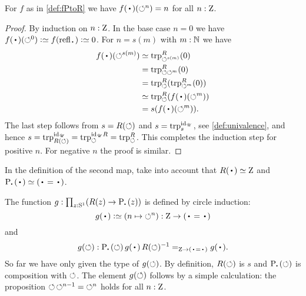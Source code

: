 \begin{lemma}\label{lem:windingnumber}
For $f$ as in \cref{def:fPtoR} we have $f(\base)(\Sloop^n)=n$ for all $n:\mathrm{Z}$.
\end{lemma}
\begin{proof}
By induction on $n:\mathrm{Z}$.  In the base case $n=0$ we have
$f(\base)(\Sloop^0)\defeq f(\refl\base)\defeq 0$.
For $n=s(m)$ with $m:\mathbb{N}$ we have
\begin{align*}
  f(\base)(\Sloop^{s(m)})&\jdeq\trp[R]{\Sloop^{s(m)}}(0)\\
  &=\trp[R]{\Sloop \Sloop^{m}}(0)\\
  &=\trp[R]{\Sloop}(\trp[R]{\Sloop^m}(0))\\
  &\jdeq \trp[R]{\Sloop}(f(\base)(\Sloop^{m}))\\
  &= s(f(\base)(\Sloop^{m})).
\end{align*}
The last step follows from ${s}=R(\circlearrowleft)$ 
and $s=\trp[\id_\UU]{\etop{s}}$, see \cref{def:univalence},
and hence $s=\trp[\id_\UU]{R(\Sloop)}=\trp[\id_\UU R]{\Sloop}=\trp[R]{\Sloop}$. 
This completes the induction step for positive $n$.
For negative $n$ the proof is similar.
\end{proof}

In the definition of the second map, 
take into account that $R(\base)\jdeq \zet$ and $\uc{\base}(\base) \jdeq (\base=\base)$.

\begin{definition}\label{def:gRtoP}
The function $g:\prod_{z:\Sc}(R(z)\to \uc{\base}(z))$ is 
defined by circle induction: 
\[
g(\base)\defeq \left(n \mapsto {\Sloop^n} \right) :\zet\to(\base=\base) 
\]
and 
\[
g(\Sloop): \uc{\base}(\Sloop)\, g(\base)\,R(\Sloop)^{-1}=_{\zet\to (\base=\base)} g(\base).
\]
%
So far we have only given the type of $g(\circlearrowleft)$. By definition,
$R(\circlearrowleft)$ is $s$ and $\uc{\base}(\Sloop)$ is composition with
$\circlearrowleft$.%
The element $g(\circlearrowleft)$ follows by a simple calculation: the
proposition ${\circlearrowleft\,\circlearrowleft^{n-1}} = {\circlearrowleft^n}$ holds for all
$n:\mathrm{Z}$.
\end{definition}


